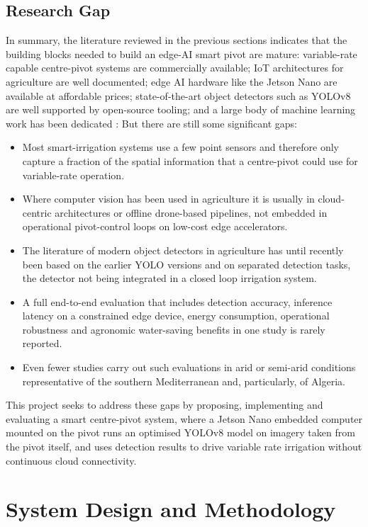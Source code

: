 \documentclass[12pt,a4paper]{report}
\begin{document}
\section{Research Gap}

In summary, the literature reviewed in the previous sections indicates that the building blocks needed to build an edge-AI smart pivot are mature: variable-rate capable centre-pivot systems are commercially available; IoT architectures for agriculture are well documented; edge AI hardware like the Jetson Nano are available at affordable prices; state-of-the-art object detectors such as YOLOv8 are well supported by open-source tooling; and a large body of machine learning work has been dedicated : But there are still some significant gaps:

\begin{itemize}
    \item Most smart-irrigation systems use a few point sensors and therefore only capture a fraction of the spatial information that a centre-pivot could use for variable-rate operation.
    \item Where computer vision has been used in agriculture it is usually in cloud-centric architectures or offline drone-based pipelines, not embedded in operational pivot-control loops on low-cost edge accelerators.
    \item The literature of modern object detectors in agriculture has until recently been based on the earlier YOLO versions and on separated detection tasks, the detector not being integrated in a closed loop irrigation system.
    \item A full end-to-end evaluation that includes detection accuracy, inference latency on a constrained edge device, energy consumption, operational robustness and agronomic water-saving benefits in one study is rarely reported.
    \item Even fewer studies carry out such evaluations in arid or semi-arid conditions representative of the southern Mediterranean and, particularly, of Algeria.
\end{itemize}

This project seeks to address these gaps by proposing, implementing and evaluating a smart centre-pivot system, where a Jetson Nano embedded computer mounted on the pivot runs an optimised YOLOv8 model on imagery taken from the pivot itself, and uses detection results to drive variable rate irrigation without continuous cloud connectivity.

\chapter{System Design and Methodology}
\pagestyle{fancy}
\thispagestyle{empty}
\end{document}
